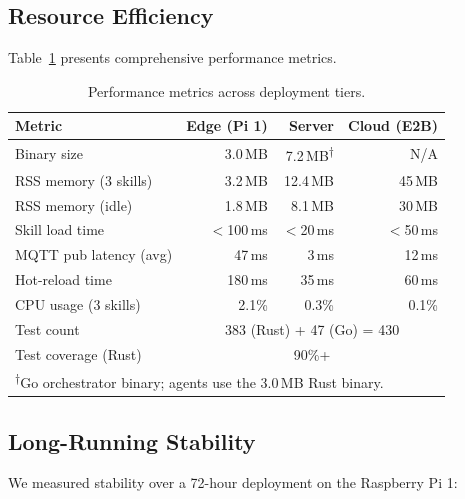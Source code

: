 \documentclass{article}
\begin{document}
\subsection{Resource Efficiency}

Table~\ref{tab:performance_detailed} presents comprehensive performance metrics.

\begin{table}[t]
\centering
\caption{Performance metrics across deployment tiers.}
\label{tab:performance_detailed}
\small
\begin{tabular}{lrrr}
\toprule
\textbf{Metric} & \textbf{Edge (Pi 1)} & \textbf{Server} & \textbf{Cloud (E2B)} \\
\midrule
Binary size & 3.0\,MB & 7.2\,MB\textsuperscript{$\dagger$} & N/A \\
RSS memory (3 skills) & 3.2\,MB & 12.4\,MB & 45\,MB \\
RSS memory (idle) & 1.8\,MB & 8.1\,MB & 30\,MB \\
Skill load time & $<$100\,ms & $<$20\,ms & $<$50\,ms \\
MQTT pub latency (avg) & 47\,ms & 3\,ms & 12\,ms \\
Hot-reload time & 180\,ms & 35\,ms & 60\,ms \\
CPU usage (3 skills) & 2.1\% & 0.3\% & 0.1\% \\
\midrule
Test count & \multicolumn{3}{c}{383 (Rust) + 47 (Go) = 430} \\
Test coverage (Rust) & \multicolumn{3}{c}{90\%+} \\
\bottomrule
\multicolumn{4}{l}{\textsuperscript{$\dagger$}\scriptsize Go orchestrator binary; agents use the 3.0\,MB Rust binary.}
\end{tabular}
\end{table}


\subsection{Long-Running Stability}

We measured stability over a 72-hour deployment on the Raspberry Pi 1:
\end{document}
